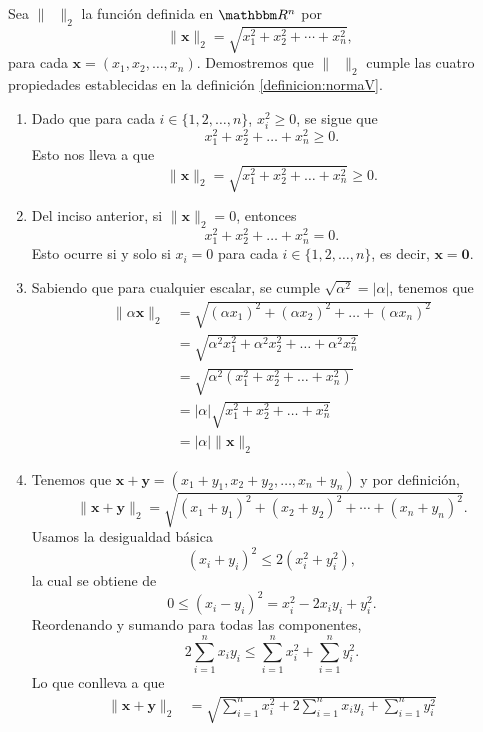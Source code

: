 \begin{examplebox}{}{}
    Sea $\| \phantom{x} \|_2$ la función definida en $\RR[n]$ por
    $$\| \mathbf{x} \|_2 = \sqrt{x_1^2 + x_2^2 + \cdots + x_n^2},$$
    para cada $\mathbf{x} = (x_1, x_2, \dots, x_n)$. Demostremos que $\| \phantom{x} \|_2$ cumple las cuatro propiedades establecidas en la definición \ref{definicion:normaV}.
    \begin{enumerate}[label=\roman*), topsep=6pt, itemsep=0pt]
        \item Dado que para cada $i \in \{ 1, 2, \dots, n \}$, $x_i^2 \geq 0$, se sigue que
        $$x_1^2 + x_2^2 + \dots + x_n^2 \geq 0.$$
        Esto nos lleva a que
        $$\| \mathbf{x} \|_2 = \sqrt{x_1^2 + x_2^2 + \dots + x_n^2} \geq 0.$$
        \item Del inciso anterior, si $\| \mathbf{x} \|_2 = 0$, entonces
        $$x_1^2 + x_2^2 + \dots + x_n^2 = 0.$$
        Esto ocurre si y solo si $x_i = 0$ para cada $i \in \{ 1, 2, \dots, n \}$, es decir, $\mathbf{x} = \mathbf{0}$.
        \item Sabiendo que para cualquier escalar, se cumple $\sqrt{\alpha^2} = |\alpha|$, tenemos que
        \begin{align*}
            \|\alpha \mathbf{x}\|_2 & = \sqrt{(\alpha x_1)^2 + (\alpha x_2)^2 + \dots + (\alpha x_n)^2} \\
            & = \sqrt{\alpha^2 x_1^2 + \alpha^2 x_2^2 + \dots + \alpha^2 x_n^2} \\
            & = \sqrt{\alpha^2 \left(x_1^2 + x_2^2 + \dots + x_n^2\right)} \\
            & = |\alpha| \sqrt{x_1^2 + x_2^2 + \dots + x_n^2} \\
            & = |\alpha| \| \mathbf{x} \|_2
        \end{align*}
        \item Tenemos que $\mathbf{x} + \mathbf{y} = (x_1 + y_1, x_2 + y_2, \dots, x_n + y_n)$ y por definición,
        $$\| \mathbf{x} + \mathbf{y} \|_2 = \sqrt{(x_1 + y_1)^2 + (x_2 + y_2)^2 + \cdots + (x_n + y_n)^2}.$$
        Usamos la desigualdad básica
        $$(x_i + y_i)^2 \leq 2\left(x_i^2 + y_i^2\right),$$
        la cual se obtiene de
        $$0 \leq (x_i - y_i)^2 = x_i^2 - 2x_iy_i + y_i^2.$$
        Reordenando y sumando para todas las componentes,
        $$2 \sum_{i=1}^{n} x_i y_i \leq \sum_{i=1}^{n} x_i^2 + \sum_{i=1}^{n} y_i^2.$$
        Lo que conlleva a que
        \begin{align*}
            \| \mathbf{x} + \mathbf{y} \|_2 & = \sqrt{\sum_{i=1}^{n} x_i^2 + 2 \sum_{i=1}^{n} x_i y_i + \sum_{i=1}^{n} y_i^2} \\

\end{align*}
\end{enumerate}
\end{examplebox}
